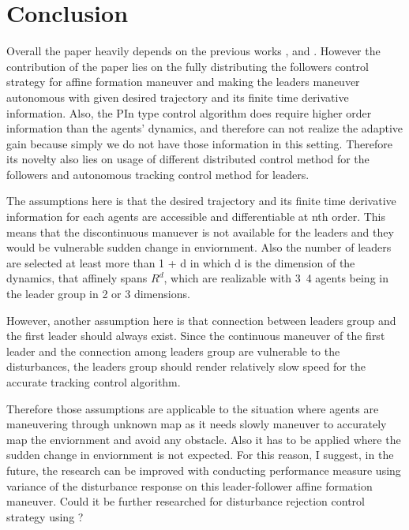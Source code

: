 \section{Conclusion} \label{Conclusion}
 Overall the paper heavily depends on the previous works \cite{8270608}, \cite{7322205} and \cite{ALFAKIH2008962}. However the contribution of the paper lies on the fully distributing the followers control strategy for affine formation maneuver and making the leaders maneuver autonomous with given desired trajectory and its finite time derivative information. Also, the PIn type control algorithm does require higher order information than the agents' dynamics, and therefore can not realize the adaptive gain because simply we do not have those information in this setting. Therefore its novelty also lies on usage of different distributed control method for the followers and autonomous tracking control method for leaders. 

 The assumptions here is that the desired trajectory and its finite time derivative information for each agents are accessible and differentiable at nth order. This means that the discontinuous manuever is not available for the leaders and they would be vulnerable sudden change in enviornment. Also the number of leaders are selected at least more than 1 + d in which d is the dimension of the dynamics, that affinely spans $R^d$, which are realizable with 3~4 agents being in the leader group in 2 or 3 dimensions. 
 
 However, another assumption here is that connection between leaders group and the first leader should always exist. Since the continuous maneuver of the first leader and the connection among leaders group are vulnerable to the disturbances, the leaders group should render relatively slow speed for the accurate tracking control algorithm. 
 
 Therefore those assumptions are applicable to the situation where agents are maneuvering through unknown map as it needs slowly maneuver to accurately map the enviornment and avoid any obstacle. Also it has to be applied where the sudden change in enviornment is not expected. For this reason, I suggest, in the future, the research can be improved with conducting performance measure using variance of the disturbance response on this leader-follower affine formation maneuver. Could it be further researched for disturbance rejection control strategy using \cite{8483481}?
